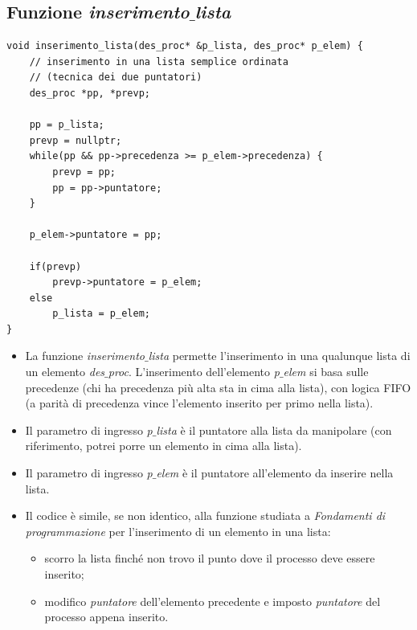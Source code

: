 \documentclass[11pt]{report}
\theoremstyle{definition}
\begin{document}
\subsection{Funzione \emph{inserimento$\_$lista}}
\small
\begin{verbatim}
void inserimento_lista(des_proc* &p_lista, des_proc* p_elem) {
    // inserimento in una lista semplice ordinata
    // (tecnica dei due puntatori)
    des_proc *pp, *prevp;
    
    pp = p_lista;
    prevp = nullptr;
    while(pp && pp->precedenza >= p_elem->precedenza) {
        prevp = pp;
        pp = pp->puntatore;
    }

    p_elem->puntatore = pp;
    
    if(prevp)
        prevp->puntatore = p_elem;
    else
        p_lista = p_elem;
}
\end{verbatim}
\normalsize 
\begin{itemize}
	\item La funzione \emph{inserimento$\_$lista} permette l'inserimento in una qualunque lista di un elemento \emph{des$\_$proc}. L'inserimento dell'elemento \emph{p$\_$elem} si basa sulle precedenze (chi ha precedenza più alta sta in cima alla lista), con logica FIFO (a parità di precedenza vince l'elemento inserito per primo nella lista).
	\item Il parametro di ingresso \emph{p$\_$lista} è il puntatore alla lista da manipolare (con riferimento, potrei porre un elemento in cima alla lista). 
	\item Il parametro di ingresso \emph{p$\_$elem} è il puntatore all'elemento da inserire nella lista.
	\item Il codice è simile, se non identico, alla funzione studiata a \emph{Fondamenti di programmazione} per l'inserimento di un elemento in una lista: 
	\begin{itemize}
		\item scorro la lista finché non trovo il punto dove il processo deve essere inserito;
		\item modifico \emph{puntatore} dell'elemento precedente e imposto \emph{puntatore} del processo appena inserito.
	\end{itemize}
\end{itemize}
\end{document}
